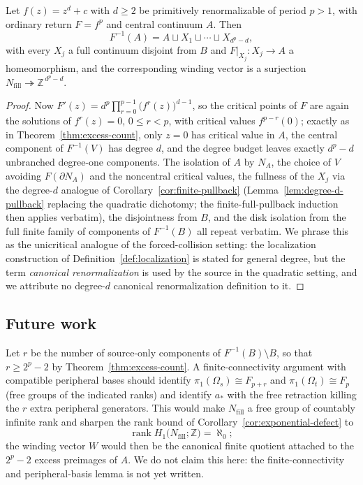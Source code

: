 \begin{theorem}\label{thm:unicritical}
Let $f(z)=z^{d}+c$ with $d\ge2$ be primitively renormalizable of period
$p>1$, with ordinary return $F=f^{p}$ and central continuum $A$.  Then
\[
 F^{-1}(A)=A\sqcup X_1\sqcup\cdots\sqcup X_{d^{p}-d},
\]
with every $X_j$ a full continuum disjoint from $B$ and
$F|_{X_j}\colon X_j\to A$ a homeomorphism, and the corresponding
winding vector is a surjection
$N_{\mathrm{fill}}\twoheadrightarrow\mathbb Z^{\,d^{p}-d}$.
\end{theorem}

\begin{proof}
Now $F'(z)=d^{p}\prod_{r=0}^{p-1}\bigl(f^{r}(z)\bigr)^{d-1}$, so the
critical points of $F$ are again the solutions of $f^{r}(z)=0$,
$0\le r<p$, with critical values $f^{p-r}(0)$; exactly as in
Theorem~\ref{thm:excess-count}, only $z=0$ has critical value in $A$,
the central component of $F^{-1}(V)$ has degree $d$, and the degree
budget leaves exactly $d^{p}-d$ unbranched degree-one components.  The
isolation of $A$ by $N_A$, the choice of $V$ avoiding $F(\partial N_A)$
and the noncentral critical values, the fullness of the $X_j$ via the
degree-$d$ analogue of Corollary~\ref{cor:finite-pullback}
(Lemma~\ref{lem:degree-d-pullback} replacing the quadratic dichotomy;
the finite-full-pullback induction then applies verbatim), the disjointness
from $B$, and the disk isolation from the full finite family of
components of $F^{-1}(B)$ all repeat verbatim.  We phrase this as the unicritical
analogue of the forced-collision setting: the localization construction
of Definition~\ref{def:localization} is stated for general degree, but
the term \emph{canonical renormalization} is used by the source in the
quadratic setting, and we attribute no degree-$d$ canonical
renormalization definition to it.
\end{proof}

\subsection{Future work}

\begin{remark}\label{rem:free-kernel}
Let $r$ be the number of source-only components of
$F^{-1}(B)\setminus B$, so that $r\ge 2^{p}-2$ by
Theorem~\ref{thm:excess-count}.  A finite-connectivity argument with
compatible peripheral bases should identify
$\pi_1(\Omega_s)\cong F_{p+r}$ and $\pi_1(\Omega_t)\cong F_{p}$ (free
groups of the indicated ranks) and identify $a_*$ with the free
retraction killing the $r$ extra peripheral generators.  This would
make $N_{\mathrm{fill}}$ a free group of countably infinite rank and
sharpen the rank bound of Corollary~\ref{cor:exponential-defect} to
\[
 \operatorname{rank}H_1\bigl(N_{\mathrm{fill}};\mathbb Z\bigr)
 =\aleph_0 ;
\]
the winding vector $W$ would then be the canonical finite quotient
attached to the $2^{p}-2$ excess preimages of $A$.  We do not claim
this here: the finite-connectivity and peripheral-basis lemma is not
yet written.
\end{remark}

